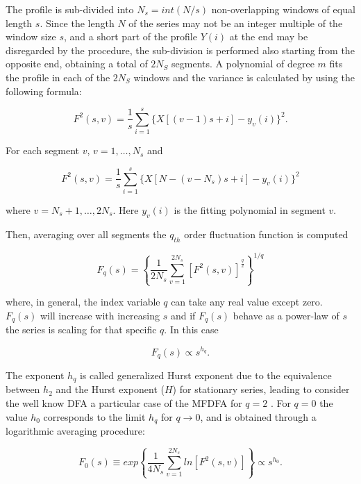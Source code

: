 \documentclass[onecolumn, preprint,aps,amsmath, amssymb, superscriptaddress]{revtex4}
\begin{document}
The profile is sub-divided into $N_s=int(N/s)$ non-overlapping windows of equal length $s$. Since the length $N$ of the series may not be an integer multiple of the window size $s$, and a short part of the profile $Y(i)$ at the end may be disregarded by the procedure, the sub-division is performed also starting from the opposite end, obtaining a total of $2N_S$ segments. A polynomial of degree $m$ fits the profile in each of the $2N_S$ windows and the variance is calculated by using the following formula:

\begin{equation}
F^2 (s,v)=\frac{1}{s} \sum_{i=1}^s\{X[(v-1)s+i]-y_v (i)\}^2.
\label{eq:var1}
\end{equation}

For each segment $v$, $v=1,\ldots,N_s$  and
 
\begin{equation}
F^2 (s,v)=\frac{1}{s} \sum_{i=1}^s\{X[N-(v-N_s )s+i]-y_v (i)\}^2
\label{eq:var2}
\end{equation}

where $v=N_s+1,\ldots,2N_s$. Here $y_v (i)$  is the fitting polynomial in segment $v$. 

Then, averaging over all segments the $q_{th}$ order fluctuation function is computed

\begin{equation}
F_q (s)=\left\lbrace \frac{1}{2N_s} \sum_{v=1}^{2N_s}[F^2 (s,v)]^{\frac{q}{2}}\right\rbrace ^{1/q}
\label{eq_f}  
\end{equation}

where, in general, the index variable $q$ can take any real value except zero. $F_q (s)$ will increase with increasing $s$ and if $F_q (s)$  behave as a power-law of $s$ the series is scaling for that specific $q$. In this case

\begin{equation}
F_q (s) \propto s^{h_q}.
\end{equation}

The exponent $h_q$ is called generalized Hurst exponent due to the equivalence between $h_2$  and the Hurst exponent ($H$) for stationary series, leading to consider the well know DFA \cite{Peng} a particular case of the MFDFA for $q=2$ \cite{Kantelhardt_2, Zhang}. For $q=0$ the value $h_0$ corresponds to the limit $h_q$ for $q \rightarrow 0$, and is obtained through a logarithmic averaging procedure:

\begin{equation}
F_0(s) \equiv exp \left\lbrace \frac{1}{4N_s} \sum_{v=1}^{2N_s} ln[F^2 (s,v)]\right\rbrace  \propto s^{h_0}.
\end{equation}
\end{document}
